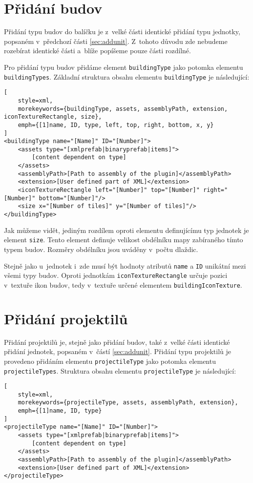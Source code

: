 \section{Přidání budov}
Přidání typu budov do balíčku je z~velké části identické přidání typu jednotky, popsaném v~předchozí části \ref{sec:addunit}. Z~tohoto důvodu zde nebudeme rozebírat identické části a~blíže popíšeme pouze části rozdílné.

Pro přidání typu budov přidáme element \texttt{buildingType} jako potomka elementu \texttt{buildingTypes}. Základní struktura obsahu elementu \texttt{buildingType} je následující:

\begin{lstlisting}[
	style=xml,
	morekeywords={buildingType, assets, assemblyPath, extension, iconTextureRectangle, size},
	emph={[1]name, ID, type, left, top, right, bottom, x, y}
]
<buildingType name="[Name]" ID="[Number]">
	<assets type="[xmlprefab|binaryprefab|items]">
		[content dependent on type]
	</assets>
	<assemblyPath>[Path to assembly of the plugin]</assemblyPath>
	<extension>[User defined part of XML]</extension>
	<iconTextureRectangle left="[Number]" top="[Number]" right="[Number]" bottom="[Number]"/>
	<size x="[Number of tiles]" y="[Number of tiles]"/>
</buildingType>
\end{lstlisting}

Jak můžeme vidět, jediným rozdílem oproti elementu definujícímu typ jednotek je element \texttt{size}. Tento element definuje velikost obdélníku mapy zabíraného tímto typem budov. Rozměry obdélníku jsou uváděny v~počtu dlaždic.

Stejně jako u~jednotek i~zde musí být hodnoty atributů \texttt{name} a \texttt{ID} unikátní mezi všemi typy budov. Oproti jednotkám \texttt{iconTextureRectangle} určuje pozici v~textuře ikon budov, tedy v~textuře určené elementem \texttt{buildingIconTexture}.


\section{Přidání projektilů}
Přidání projektilů je, stejně jako přidání budov, také z~velké části identické přidání jednotek, popsaném v~částí \ref{sec:addunit}. Přidání typu projektilů je provedeno přidáním elementu \texttt{projectileType} jako potomka elementu \texttt{projectileTypes}. Struktura obsahu elementu \texttt{projectileType} je následující:

\begin{lstlisting}[
	style=xml,
	morekeywords={projectileType, assets, assemblyPath, extension},
	emph={[1]name, ID, type}
]
<projectileType name="[Name]" ID="[Number]">
	<assets type="[xmlprefab|binaryprefab|items]">
		[content dependent on type]
	</assets>
	<assemblyPath>[Path to assembly of the plugin]</assemblyPath>
	<extension>[User defined part of XML]</extension>
</projectileType>
\end{lstlisting}

